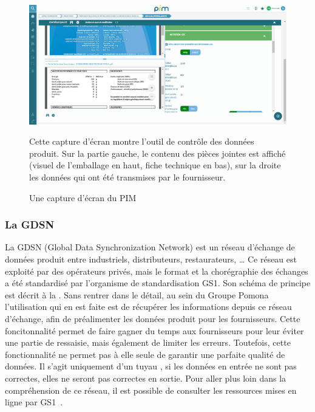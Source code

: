                 \begin{figure}[htpb]
                    \begin{center}
                    \includegraphics[width=\linewidth]{img/Ecran PIM.png}
                    \end{center}
                    Cette capture d'écran montre l'outil de contrôle des données produit. Sur la partie gauche, le contenu des pièces jointes est affiché (visuel de l'emballage en haut, fiche technique en bas), sur la droite les données qui ont été transmises par le fournisseur.
                    \caption{Une capture d'écran du PIM}
                    \label{fig:ecran_PIM}
                \end{figure} 

                \subsubsection{La GDSN}

                La GDSN (Global Data Synchronization Network) est un réseau d'échange de données produit entre industriels, distributeurs, restaurateurs, \dots
                Ce réseau est exploité par des opérateurs privés, mais le format et la chorégraphie des échanges a été standardisé par l'organisme de standardisation GS1.
                Son schéma de principe est décrit à la .
                Sans rentrer dans le détail, au sein du Groupe Pomona l'utilisation qui en est faite est de récupérer les informations depuis ce réseau d'échange, afin de préalimenter les données produit pour les fournisseurs.
                Cette foncitonnalité permet de faire gagner du temps aux fournisseurs pour leur éviter une partie de ressaisie, mais également de limiter les erreurs.
                Toutefois, cette fonctionnalité ne permet pas à elle seule de garantir une parfaite qualité de données.
                Il s'agit uniquement d'un \og tuyau \fg, si les données en entrée ne sont pas correctes, elles ne seront pas correctes en sortie.
                Pour aller plus loin dans la compréhension de ce réseau, il est possible de consulter les ressources mises en ligne par GS1~\cite{GDSN_GS1_FR}\cite{GDSN_GS1_GLOBAL}.

